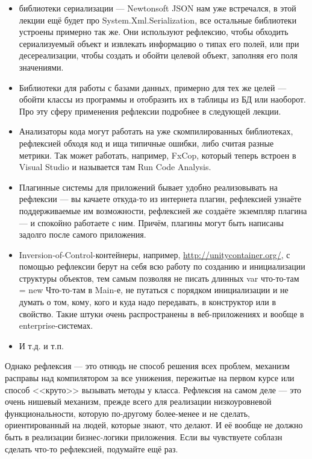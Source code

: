 \documentclass{../../text-style}
\begin{document}
\begin{itemize}
    \item библиотеки сериализации --- Newtonsoft JSON нам уже встречался, в этой лекции ещё будет про System.Xml.Serialization, все остальные библиотеки устроены примерно так же. Они используют рефлексию, чтобы обходить сериализуемый объект и извлекать информацию о типах его полей, или при десереализации, чтобы создать и обойти целевой объект, заполняя его поля значениями.
    \item Библиотеки для работы с базами данных, примерно для тех же целей --- обойти классы из программы и отобразить их в таблицы из БД или наоборот. Про эту сферу применения рефлексии подробнее в следующей лекции.
    \item Анализаторы кода могут работать на уже скомпилированных библиотеках, рефлексией обходя код и ища типичные ошибки, либо считая разные метрики. Так может работать, например, FxCop, который теперь встроен в Visual Studio и называется там Run Code Analysis.
    \item Плагинные системы для приложений бывает удобно реализовывать на рефлексии --- вы качаете откуда-то из интернета плагин, рефлексией узнаёте поддерживаемые им возможности, рефлексией же создаёте экземпляр плагина --- и спокойно работаете с ним. Причём, плагины могут быть написаны задолго после самого приложения.
    \item Inversion-of-Control-контейнеры, например, \url{http://unitycontainer.org/}, с помощью рефлексии берут на себя всю работу по созданию и инициализации структуры объектов, тем самым позволяя не писать длинных var что-то-там = new Что-то-там в Main-е, не путаться с порядком инициализации и не думать о том, кому, кого и куда надо передавать, в конструктор или в свойство. Такие штуки очень распространены в веб-приложениях и вообще в enterprise-системах.
    \item И т.д. и т.п.
\end{itemize}

Однако рефлексия --- это отнюдь не способ решения всех проблем, механизм расправы над компилятором за все унижения, пережитые на первом курсе или способ <<круто>> вызывать методы у класса. Рефлексия на самом деле --- это очень нишевый механизм, прежде всего для реализации низкоуровневой функциональности, которую по-другому более-менее и не сделать, ориентированный на людей, которые знают, что делают. И её вообще не должно быть в реализации бизнес-логики приложения. Если вы чувствуете соблазн сделать что-то рефлексией, подумайте ещё раз.
\end{document}
